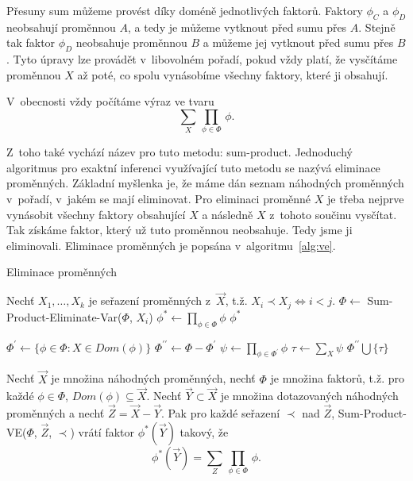 Přesuny sum můžeme provést díky doméně jednotlivých faktorů.
Faktory $\phi_C$ a $\phi_D$ neobsahují proměnnou $A$, a tedy je můžeme vytknout před sumu přes $A$.
Stejně tak faktor $\phi_D$ neobsahuje proměnnou $B$ a můžeme jej vytknout před sumu přes $B$.
Tyto úpravy lze provádět v~libovolném pořadí, pokud vždy platí, že vysčítáme proměnnou $X$ až poté, co spolu vynásobíme všechny faktory, které ji obsahují.

V~obecnosti vždy počítáme výraz ve tvaru
\[
\sum_X \,\prod_{\phi \in \Phi} \, \phi.
\]

Z~toho také vychází název pro tuto metodu: sum-product.
Jednoduchý algoritmus pro exaktní inferenci využívající tuto metodu se nazývá eliminace proměnných.
Základní myšlenka je, že máme dán seznam náhodných proměnných v~pořadí, v~jakém se mají eliminovat.
Pro eliminaci proměnné $X$ je třeba nejprve vynásobit všechny faktory obsahující $X$ a následně $X$ z~tohoto součinu vysčítat.
Tak získáme faktor, který už tuto proměnnou neobsahuje.
Tedy jsme ji eliminovali.
Eliminace proměnných je popsána v~algoritmu~\ref{alg:ve}.

\begin{algorithm}[H]
\caption{Eliminace proměnných}
\label{alg:ve}
\begin{algorithmic}
\State

\State Nechť $X_1, \dots, X_k$ je seřazení proměnných z~$\vec{X}$, t.ž. $X_i \prec X_j \Leftrightarrow i < j$.
	\State $\Phi \gets$ Sum-Product-Eliminate-Var($\Phi$, $X_i$)
\EndFor
\State $\phi^* \gets \prod_{\phi \in \Phi} \phi$
\State \Return $\phi^*$
\EndFunction
\State
{}
\State

\State $\Phi^\prime \gets \{\phi \in \Phi: X \in Dom(\phi)\}$
\State $\Phi^{\prime \prime} \gets \Phi - \Phi^\prime$
\State $\psi \gets \prod_{\phi \in \Phi^\prime} \phi$
\State $\tau \gets \sum_X \psi$
\State \Return $\Phi^{\prime\prime} \bigcup \{\tau\}$
\EndFunction
\end{algorithmic}
\end{algorithm}

Nechť $\vec{X}$ je množina náhodných proměnných, nechť $\Phi$ je množina faktorů, t.ž. pro každé $\phi \in \Phi$, $Dom(\phi) \subseteq \vec{X}$.
Nechť $\vec{Y} \subset \vec{X}$ je množina dotazovaných náhodných proměnných a nechť $\vec{Z} = \vec{X} - \vec{Y}$.
Pak pro každé seřazení $\prec$ nad $\vec{Z}$, Sum-Product-VE($\Phi$, $\vec{Z}$, $\prec$) vrátí faktor $\phi^*(\vec{Y})$ takový, že
\[
\phi^*(\vec{Y}) = \sum_Z \, \prod_{\phi \in \Phi} \, \phi.
\]

